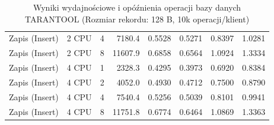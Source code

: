 \begin{table}[ht]
{\begin{tabular}{llcrrrrr}
Zapis (Insert) & 2 CPU & 4 & 7180.4 & 0.5528 & 0.5271 & 0.8397 & 1.0281 \\
Zapis (Insert) & 2 CPU & 8 & 11607.9 & 0.6858 & 0.6564 & 1.0924 & 1.3334 \\
Zapis (Insert) & 4 CPU & 1 & 2328.3 & 0.4295 & 0.3973 & 0.6920 & 0.8384 \\
Zapis (Insert) & 4 CPU & 2 & 4052.0 & 0.4930 & 0.4712 & 0.7500 & 0.8790 \\
Zapis (Insert) & 4 CPU & 4 & 7540.4 & 0.5256 & 0.5039 & 0.8101 & 0.9941 \\
Zapis (Insert) & 4 CPU & 8 & 11751.8 & 0.6774 & 0.6464 & 1.0869 & 1.3363 \\
\bottomrule
\end{tabular}%
}
\caption{Wyniki wydajnościowe i opóźnienia operacji bazy danych TARANTOOL (Rozmiar rekordu: 128 B, 10k operacji/klient)}
\label{tab:latency_tarantool_small_10000}
\end{table}
